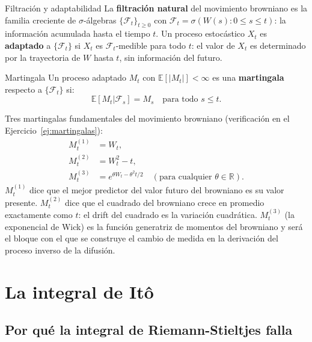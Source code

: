 \begin{definicion}{Filtración y adaptabilidad}
\label{def:filtracion}
La \textbf{filtración natural} del movimiento browniano es la familia creciente
de $\sigma$-álgebras $\{\mathcal{F}_t\}_{t \geq 0}$ con
$\mathcal{F}_t = \sigma(W(s): 0 \leq s \leq t)$: la información acumulada
hasta el tiempo $t$. Un proceso estocástico $X_t$ es \textbf{adaptado} a
$\{\mathcal{F}_t\}$ si $X_t$ es $\mathcal{F}_t$-medible para todo $t$: el
valor de $X_t$ es determinado por la trayectoria de $W$ hasta $t$, sin
información del futuro.
\end{definicion}

\begin{definicion}{Martingala}
\label{def:martingala}
Un proceso adaptado $M_t$ con $\mathbb{E}[|M_t|] < \infty$ es una
\textbf{martingala} respecto a $\{\mathcal{F}_t\}$ si:
\[
  \mathbb{E}[M_t | \mathcal{F}_s] = M_s \quad \text{para todo } s \leq t.
\]
\end{definicion}

Tres martingalas fundamentales del movimiento browniano (verificación en
el Ejercicio~\ref{ej:martingalas}):
\begin{align}
  M_t^{(1)} &= W_t, \label{eq:mart1}\\
  M_t^{(2)} &= W_t^2 - t, \label{eq:mart2}\\
  M_t^{(3)} &= e^{\theta W_t - \theta^2 t/2}
  \quad (\text{para cualquier } \theta \in \mathbb{R}).
  \label{eq:mart3}
\end{align}
$M_t^{(1)}$ dice que el mejor predictor del valor futuro del browniano es su
valor presente. $M_t^{(2)}$ dice que el cuadrado del browniano crece en
promedio exactamente como $t$: el drift del cuadrado es la variación cuadrática.
$M_t^{(3)}$ (la exponencial de Wick) es la función generatriz de momentos del
browniano y será el bloque con el que se construye el cambio de medida en la
derivación del proceso inverso de la difusión.

\section{La integral de Itô}
\label{sec:integral_ito}

\subsection{Por qué la integral de Riemann-Stieltjes falla}
\label{subsec:fallo_rs}

